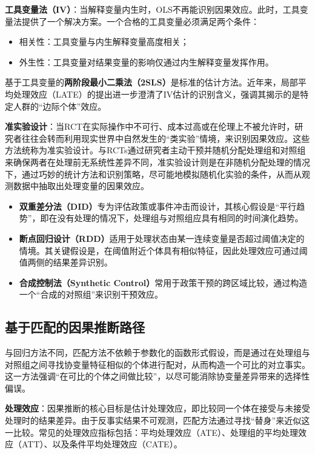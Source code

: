 \textbf{工具变量法（IV）}：当解释变量内生时，OLS不再能识别因果效应。此时，工具变量法提供了一个解决方案。一个合格的工具变量必须满足两个条件：

\begin{itemize}
	\item 相关性：工具变量与内生解释变量高度相关；
	\item 外生性：工具变量对结果变量的影响仅通过内生解释变量发挥作用。
\end{itemize}

基于工具变量的\textbf{两阶段最小二乘法（2SLS）}是标准的估计方法。近年来，局部平均处理效应（LATE）的提出进一步澄清了IV估计的识别含义，强调其揭示的是特定人群的“边际个体”效应。

\textbf{准实验设计}：当RCT在实际操作中不可行、成本过高或在伦理上不被允许时，研究者往往会转而利用现实世界中自然发生的“类实验”情境，来识别因果效应。这些方法统称为准实验设计。与RCTs通过研究者主动干预并随机分配处理组和对照组来确保两者在处理前无系统性差异不同，准实验设计则是在非随机分配处理的情况下，通过巧妙的统计方法和识别策略，尽可能地模拟随机化实验的条件，从而从观测数据中抽取出处理变量的因果效应。

\begin{itemize}
    \item \textbf{双重差分法（DID）}专为评估政策或事件冲击而设计，其核心假设是“平行趋势”，即在没有处理的情况下，处理组与对照组应具有相同的时间演化趋势。
    \item \textbf{断点回归设计（RDD）}适用于处理状态由某一连续变量是否超过阈值决定的情境。其关键假设是，在阈值附近个体具有相似特征，因此处理效应可通过阈值两侧的结果差异识别。
    \item \textbf{合成控制法（Synthetic Control）}常用于政策干预的跨区域比较，通过构造一个“合成的对照组”来识别干预效应。
\end{itemize}

\subsection{基于匹配的因果推断路径}

与回归方法不同，匹配方法不依赖于参数化的函数形式假设，而是通过在处理组与对照组之间寻找协变量特征相似的个体进行配对，从而构造一个可比的对立事实。这一方法强调“在可比的个体之间做比较”，以尽可能消除协变量差异带来的选择性偏误。

\textbf{处理效应}：因果推断的核心目标是估计处理效应，即比较同一个体在接受与未接受处理时的结果差异。由于反事实结果不可观测，匹配方法通过寻找“替身”来近似这一比较。常见的处理效应指标包括：平均处理效应（ATE）、处理组的平均处理效应（ATT）、以及条件平均处理效应（CATE）。

